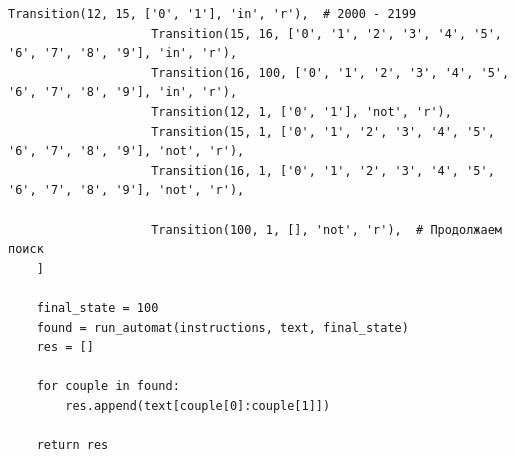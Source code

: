 \documentclass[a4paper, 14pt]{article}
\begin{document}
\begin{lstlisting}[label=some-code,caption=Автомат для поиска даты в формате dd.mm.yyyy]
                    Transition(12, 15, ['0', '1'], 'in', 'r'),  # 2000 - 2199
                    Transition(15, 16, ['0', '1', '2', '3', '4', '5', '6', '7', '8', '9'], 'in', 'r'),
                    Transition(16, 100, ['0', '1', '2', '3', '4', '5', '6', '7', '8', '9'], 'in', 'r'),
                    Transition(12, 1, ['0', '1'], 'not', 'r'),
                    Transition(15, 1, ['0', '1', '2', '3', '4', '5', '6', '7', '8', '9'], 'not', 'r'),
                    Transition(16, 1, ['0', '1', '2', '3', '4', '5', '6', '7', '8', '9'], 'not', 'r'),

                    Transition(100, 1, [], 'not', 'r'),  # Продолжаем поиск
    ]

    final_state = 100
    found = run_automat(instructions, text, final_state)
    res = []

    for couple in found:
        res.append(text[couple[0]:couple[1]])

    return res
		\end{lstlisting}
\end{document}
